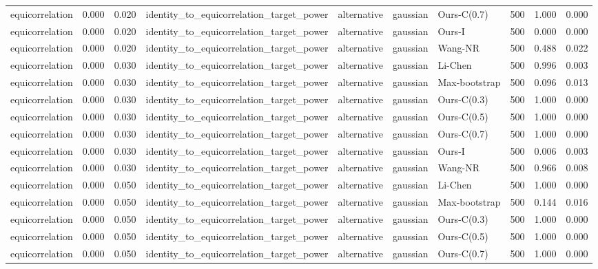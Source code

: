 \begin{tabular}{lrrllllrrr}
equicorrelation & 0.000 & 0.020 & identity\_to\_equicorrelation\_target\_power & alternative & gaussian & Ours-C(0.7) & 500 & 1.000 & 0.000 \\
equicorrelation & 0.000 & 0.020 & identity\_to\_equicorrelation\_target\_power & alternative & gaussian & Ours-I & 500 & 0.000 & 0.000 \\
equicorrelation & 0.000 & 0.020 & identity\_to\_equicorrelation\_target\_power & alternative & gaussian & Wang-NR & 500 & 0.488 & 0.022 \\
equicorrelation & 0.000 & 0.030 & identity\_to\_equicorrelation\_target\_power & alternative & gaussian & Li-Chen & 500 & 0.996 & 0.003 \\
equicorrelation & 0.000 & 0.030 & identity\_to\_equicorrelation\_target\_power & alternative & gaussian & Max-bootstrap & 500 & 0.096 & 0.013 \\
equicorrelation & 0.000 & 0.030 & identity\_to\_equicorrelation\_target\_power & alternative & gaussian & Ours-C(0.3) & 500 & 1.000 & 0.000 \\
equicorrelation & 0.000 & 0.030 & identity\_to\_equicorrelation\_target\_power & alternative & gaussian & Ours-C(0.5) & 500 & 1.000 & 0.000 \\
equicorrelation & 0.000 & 0.030 & identity\_to\_equicorrelation\_target\_power & alternative & gaussian & Ours-C(0.7) & 500 & 1.000 & 0.000 \\
equicorrelation & 0.000 & 0.030 & identity\_to\_equicorrelation\_target\_power & alternative & gaussian & Ours-I & 500 & 0.006 & 0.003 \\
equicorrelation & 0.000 & 0.030 & identity\_to\_equicorrelation\_target\_power & alternative & gaussian & Wang-NR & 500 & 0.966 & 0.008 \\
equicorrelation & 0.000 & 0.050 & identity\_to\_equicorrelation\_target\_power & alternative & gaussian & Li-Chen & 500 & 1.000 & 0.000 \\
equicorrelation & 0.000 & 0.050 & identity\_to\_equicorrelation\_target\_power & alternative & gaussian & Max-bootstrap & 500 & 0.144 & 0.016 \\
equicorrelation & 0.000 & 0.050 & identity\_to\_equicorrelation\_target\_power & alternative & gaussian & Ours-C(0.3) & 500 & 1.000 & 0.000 \\
equicorrelation & 0.000 & 0.050 & identity\_to\_equicorrelation\_target\_power & alternative & gaussian & Ours-C(0.5) & 500 & 1.000 & 0.000 \\
equicorrelation & 0.000 & 0.050 & identity\_to\_equicorrelation\_target\_power & alternative & gaussian & Ours-C(0.7) & 500 & 1.000 & 0.000 \\

\end{tabular}

